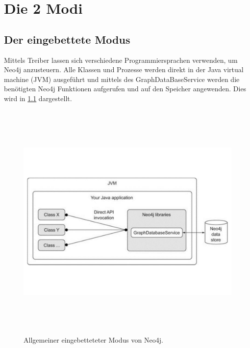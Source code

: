 
\chapter{Die 2 Modi} %

\label{ChapterX} %


\section{Der eingebettete Modus}

Mittels Treiber lassen sich verschiedene Programmiersprachen verwenden, um Neo4j anzusteuern. Alle Klassen und Prozesse werden direkt in der Java virtual machine (JVM) ausgeführt und mittels des GraphDataBaseService  werden die benötigten Neo4j Funktionen aufgerufen und auf den Speicher angewenden. Dies wird in \ref{fig:Embedded} dargestellt.
\begin{figure}[th]
	\centering
	\includegraphics [width=14cm, height=12cm]{Figures/Embedded}
	\caption[Eingebettet]{Allgemeiner eingebetteteter Modus von Neo4j.}
	\label{fig:Embedded}
\end{figure}


